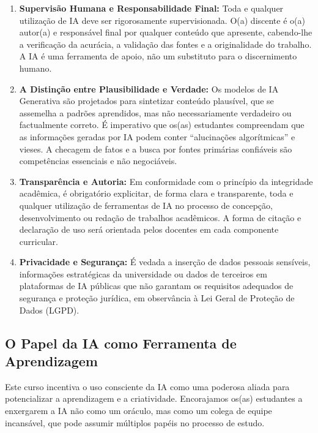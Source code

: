 \begin{enumerate}
    \item \textbf{Supervisão Humana e Responsabilidade Final:} Toda e qualquer utilização de IA deve ser rigorosamente supervisionada. O(a) discente é o(a) autor(a) e responsável final por qualquer conteúdo que apresente, cabendo-lhe a verificação da acurácia, a validação das fontes e a originalidade do trabalho. A IA é uma ferramenta de apoio, não um substituto para o discernimento humano.

    \item \textbf{A Distinção entre Plausibilidade e Verdade:} Os modelos de IA Generativa são projetados para sintetizar conteúdo plausível, que se assemelha a padrões aprendidos, mas não necessariamente verdadeiro ou factualmente correto. É imperativo que os(as) estudantes compreendam que as informações geradas por IA podem conter ``alucinações algorítmicas'' e vieses. A checagem de fatos e a busca por fontes primárias confiáveis são competências essenciais e não negociáveis.

    \item \textbf{Transparência e Autoria:} Em conformidade com o princípio da integridade acadêmica, é obrigatório explicitar, de forma clara e transparente, toda e qualquer utilização de ferramentas de IA no processo de concepção, desenvolvimento ou redação de trabalhos acadêmicos. A forma de citação e declaração de uso será orientada pelos docentes em cada componente curricular.

    \item \textbf{Privacidade e Segurança:} É vedada a inserção de dados pessoais sensíveis, informações estratégicas da universidade ou dados de terceiros em plataformas de IA públicas que não garantam os requisitos adequados de segurança e proteção jurídica, em observância à Lei Geral de Proteção de Dados (LGPD).
\end{enumerate}

\subsection{O Papel da IA como Ferramenta de Aprendizagem}

Este curso incentiva o uso consciente da IA como uma poderosa aliada para potencializar a aprendizagem e a criatividade. Encorajamos os(as) estudantes a enxergarem a IA não como um oráculo, mas como um colega de equipe incansável, que pode assumir múltiplos papéis no processo de estudo.


